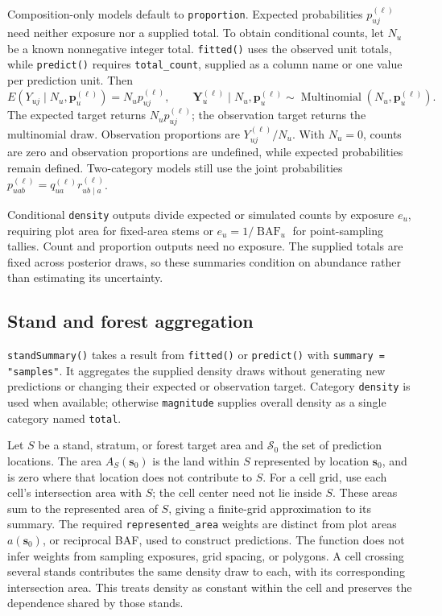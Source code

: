 \documentclass[11pt]{article}
\newcommand{\bp}{\bm{p}}
\newcommand{\bs}{\bm{s}}
\begin{document}
Composition-only models default to \texttt{proportion}. Expected
probabilities \(p_{uj}^{(\ell)}\) need neither exposure nor a supplied total.
To obtain conditional counts, let \(N_u\) be a known nonnegative integer total.
\texttt{fitted()} uses the observed unit totals, while \texttt{predict()}
requires \texttt{total\_count}, supplied as a column name or one value per
prediction unit. Then
\[
  E(Y_{uj}\mid N_u,\bp_u^{(\ell)})=N_up_{uj}^{(\ell)},
  \qquad
  \mathbf Y_u^{(\ell)}\mid N_u,\bp_u^{(\ell)}
  \sim\operatorname{Multinomial}(N_u,\bp_u^{(\ell)}).
\]
The expected target returns \(N_up_{uj}^{(\ell)}\); the observation target
returns the multinomial draw. Observation proportions are
\(Y_{uj}^{(\ell)}/N_u\). With \(N_u=0\), counts are zero and observation
proportions are undefined, while expected probabilities remain defined.
Two-category models still use the joint probabilities
\(p_{uab}^{(\ell)}=q_{ua}^{(\ell)}r_{ub\mid a}^{(\ell)}\).

Conditional \texttt{density} outputs divide expected or simulated counts by
exposure \(e_u\), requiring plot area for fixed-area stems or
\(e_u=1/\operatorname{BAF}_u\) for point-sampling tallies. Count and
proportion outputs need no exposure. The supplied totals are fixed across
posterior draws, so these summaries condition on abundance rather than
estimating its uncertainty.

\subsection{Stand and forest aggregation}

\texttt{standSummary()} takes a result from \texttt{fitted()} or
\texttt{predict()} with \texttt{summary = "samples"}. It aggregates the
supplied density draws without generating new predictions or changing their
expected or observation target. Category \texttt{density} is used when
available; otherwise \texttt{magnitude} supplies overall density as a single
category named \texttt{total}.

Let \(S\) be a stand, stratum, or forest target area and \(\mathcal S_0\)
the set of prediction locations. The area \(A_S(\bs_0)\) is the land within
\(S\) represented by location \(\bs_0\), and is zero where that location does
not contribute to \(S\). For a cell grid, use each cell's intersection area
with \(S\); the cell center need not lie inside \(S\). These areas sum to
the represented area of \(S\), giving a finite-grid approximation to its
summary. The required \texttt{represented\_area} weights are distinct from
plot areas \(a(\bs_0)\), or reciprocal BAF, used to construct predictions.
The function does not infer weights from sampling exposures, grid spacing,
or polygons. A cell crossing several stands contributes the same density
draw to each, with its corresponding intersection area. This treats density
as constant within the cell and preserves the dependence shared by those stands.
\end{document}
